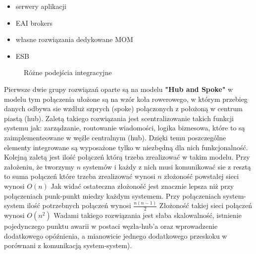 \begin{itemize}
	\item serwery aplikacji
	\item EAI brokers
	\item własne rozwiązania dedykowane  MOM
	\item ESB
\end{itemize}
\setlength\fboxsep{20pt}
\setlength\fboxrule{1pt}
\begin{figure}[!h]
	\centering
	\caption{Różne podejścia integracyjne  \cite{chappell2004}}\label{fig:podejscia_integracyjne}
\end{figure}

Pierwsze dwie grupy rozwiązań oparte są na modelu \textbf{"Hub and Spoke"}  w modelu tym połączenia ułożone są na wzór koła rowerowego, w którym przebieg danych odbywa sie wzdłuż szprych (spoke) połączonych z położoną w centrum piastą (hub). Zaletą takiego rozwiązania jest scentralizowanie takich funkcji systemu jak: zarządzanie, routowanie wiadomości, logika biznesowa, które to są zaimplementeowane w węźle centralnym (hub). Dzięki temu poszczególne elementy integrowane są wyposażone tylko w niezbędną dla nich funkcjonalność. Kolejną zaletą jest ilość połączeń którą trzeba zrealizować w takim modelu. Przy założeniu, że tworzymy \begin{math}n\end{math}  systemów i każdy z nich musi komunikować sie z resztą to suma połączeń które trzeba zrealizować wynosi  \begin{math}n\end{math}  złożoność powstałej sieci wynosi  \begin{math}O(n)\end{math}  Jak widać ostateczna złożoność jest znacznie lepsza niż przy połączeniach punk-punkt miedzy każdym systemem. Przy połączeniach system-system  ilość potrzebnych połączeń wynosi   \begin{math}\frac{n (n- 1)}{2}\end{math}  Złożoność takiej sieci połączeń wynosi  \begin{math}O(n^2)\end{math}  Wadami takiego rozwiązania jest słaba skalowalność, istnienie pojedynczego punktu awarii w postaci węzła-hub'a oraz wprowadzenie dodatkowego opóźnienia, a mianowicie jednego dodatkowego przeskoku w porównani z komunikacją system-system).

